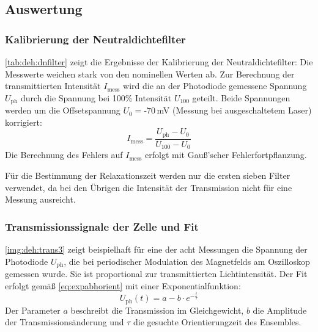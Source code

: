 \subsection{Auswertung}

\subsubsection*{Kalibrierung der Neutraldichtefilter}

\autoref{tab:deh:dnfilter} zeigt die Ergebnisse der Kalibrierung der Neutraldichtefilter:
Die Messwerte weichen stark von den nominellen Werten ab.
Zur Berechnung der transmittierten Intensität $I_\text{mess}$ wird
die an der Photodiode gemessene Spannung $U_{\text{ph}}$
durch die Spannung bei 100\% Intensität $U_{100}$ geteilt.
Beide Spannungen werden um die Offsetspannung $U_{0}=\text{-}70\,$mV (Messung bei ausgeschaltetem Laser) korrigiert:
\begin{equation}
  I_\text{mess}=\frac{U_{\text{ph}}-U_{0}}{U_{100}-U_{0}}
\end{equation}
Die Berechnung des Fehlers auf $I_\text{mess}$ erfolgt mit Gauß'scher Fehlerfortpflanzung.


Für die Bestimmung der Relaxationszeit werden nur die ersten sieben Filter verwendet,
da bei den Übrigen die Intensität der Transmission nicht für eine Messung ausreicht.



\subsubsection*{Transmissionssignale der Zelle und Fit}
\autoref{img:deh:trans3} zeigt beispielhaft für eine der acht Messungen
die Spannung der Photodiode $U_{\text{ph}}$,
die bei periodischer Modulation des Magnetfelds am Oszilloskop gemessen wurde.
Sie ist proportional zur transmittierten Lichtintensität.
Der Fit erfolgt gemäß \autoref{eq:expabhorient} mit einer Exponentialfunktion:
\begin{equation}
  U_{\text{ph}}(t)=a - b \cdot e^{-\frac{t}{\tau}}
\end{equation}
Der Parameter $a$ beschreibt die Transmission im Gleichgewicht, $b$ die Amplitude der
Transmissionsänderung und $\tau$ die gesuchte Orientierungzeit des Ensembles.

